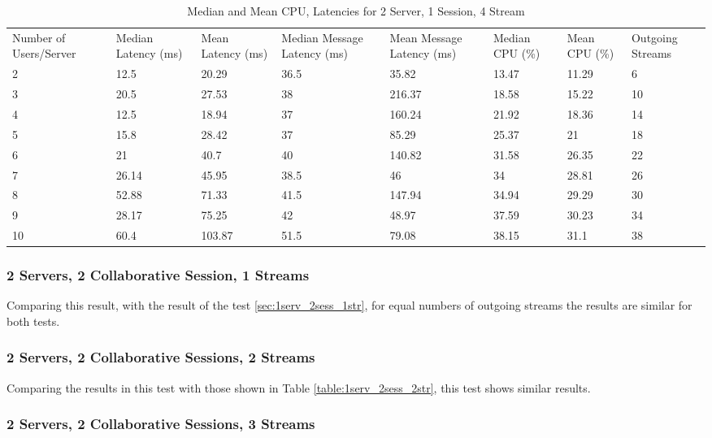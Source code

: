 \begin{table}
\caption{Median and Mean CPU, Latencies for 2 Server, 1 Session, 4 Stream}
\label{table:2serv_1sess_4str}
\begin{tabu} to\linewidth{|X[c]|X[c]|X[c]|X[c]|X[c]|X[c]|X[c]|X[c]|}
\everyrow{\hline}
\hline
Number of Users/Server & Median Latency (ms) & Mean Latency (ms) & Median Message Latency (ms) & Mean Message Latency (ms) & Median CPU (\%) & Mean CPU (\%) & Outgoing Streams\\
2 & 12.5 & 20.29 & 36.5 & 35.82 & 13.47 & 11.29 & 6 \\
3 & 20.5 & 27.53 & 38 & 216.37 & 18.58 & 15.22 & 10 \\
4 & 12.5 & 18.94 & 37 & 160.24 & 21.92 & 18.36 & 14 \\
5 & 15.8 & 28.42 & 37 & 85.29 & 25.37 & 21 & 18 \\
6 & 21 & 40.7 & 40 & 140.82 & 31.58 & 26.35 & 22 \\
7 & 26.14 & 45.95 & 38.5 & 46 & 34 & 28.81 & 26 \\
8 & 52.88 & 71.33 & 41.5 & 147.94 & 34.94 & 29.29 & 30 \\
9 & 28.17 & 75.25 & 42 & 48.97 & 37.59 & 30.23 & 34 \\
10 & 60.4 & 103.87 & 51.5 & 79.08 & 38.15 & 31.1 & 38 \\
\end{tabu}
\end{table}

\clearpage\subsubsection{2 Servers, 2 Collaborative Session, 1 Streams}

Comparing this result, with the result of the test \ref{sec:1serv_2sess_1str}, for equal numbers of outgoing streams the results are similar for both tests.

\subsubsection{2 Servers, 2 Collaborative Sessions, 2 Streams}

Comparing the results in this test with those shown in Table \ref{table:1serv_2sess_2str}, this test shows similar results.

\subsubsection{2 Servers, 2 Collaborative Sessions, 3 Streams}


